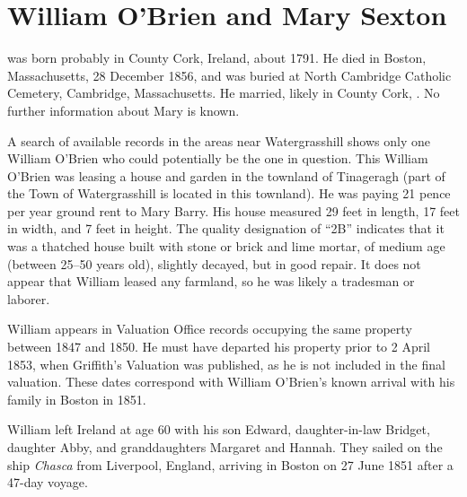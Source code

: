 \section{William O'Brien and Mary Sexton}\label{per:William1OBrien}

 was born probably in County Cork, Ireland, about 1791.\cite{Census1855William:2} He died in Boston, Massachusetts, 28 December 1856,\cite{William1OBrienDeath:1} and was buried at North Cambridge Catholic Cemetery, Cambridge, Massachusetts.\cite{DianaBerberenaLetter1:1} He married, likely in County Cork, .\cite{MarySexton} No further information about Mary is known.

A search of available records in the areas near Watergrasshill shows only one William O'Brien who could potentially be the one in question. This William O'Brien was leasing a house and garden in the townland of Tinageragh (part of the Town of Watergrasshill is located in this townland). He was paying 21 pence per year ground rent to Mary Barry.\cite{TenureBook1847:1} His house measured 29 feet in length, 17 feet in width, and 7 feet in height.\cite{HouseBook1849} The quality designation of ``2B'' indicates that it was a thatched house built with stone or brick and lime mortar, of medium age (between 25--50 years old), slightly decayed, but in good repair. It does not appear that William leased any farmland, so he was likely a tradesman or laborer.\cite{WilliamOBrienSearch:1} 

William appears in Valuation Office records occupying the same property between 1847\cite{TenureBook1847:2} and 1850.\cite{HouseBook1850} He must have departed his property prior to 2 April 1853, when Griffith's Valuation was published, as he is not included in the final valuation.\cite{WilliamOBrienSearch:2} These dates correspond with William O'Brien's known arrival with his family in Boston in 1851.

William left Ireland at age 60 with his son Edward, daughter-in-law Bridget, daughter Abby, and granddaughters Margaret and Hannah. They sailed on the ship \textit{Chasca}\cite{Chascay2:2} from Liverpool, England, arriving in Boston on 27 June 1851 after a 47-day voyage.\cite{Chascay:5}


